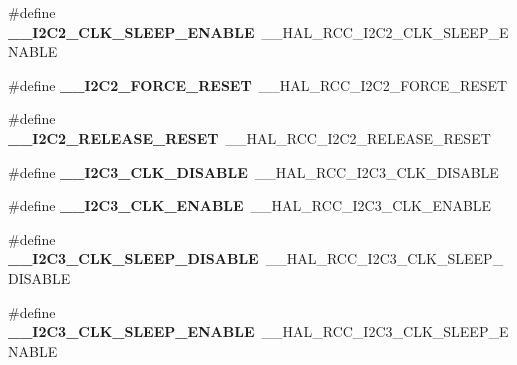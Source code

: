 \begin{DoxyCompactItemize}
\item 
\mbox{\label{group___h_a_l___r_c_c___aliased_ga64ad1beac30d497e381d374778b1a953}} 
\#define {\bfseries \+\_\+\+\_\+\+I2\+C2\+\_\+\+C\+L\+K\+\_\+\+S\+L\+E\+E\+P\+\_\+\+E\+N\+A\+B\+LE}~\+\_\+\+\_\+\+H\+A\+L\+\_\+\+R\+C\+C\+\_\+\+I2\+C2\+\_\+\+C\+L\+K\+\_\+\+S\+L\+E\+E\+P\+\_\+\+E\+N\+A\+B\+LE
\item 
\mbox{\label{group___h_a_l___r_c_c___aliased_ga07143f105327507321078f673940461d}} 
\#define {\bfseries \+\_\+\+\_\+\+I2\+C2\+\_\+\+F\+O\+R\+C\+E\+\_\+\+R\+E\+S\+ET}~\+\_\+\+\_\+\+H\+A\+L\+\_\+\+R\+C\+C\+\_\+\+I2\+C2\+\_\+\+F\+O\+R\+C\+E\+\_\+\+R\+E\+S\+ET
\item 
\mbox{\label{group___h_a_l___r_c_c___aliased_gaf7a482f23ba23252ef88c00e86edde9a}} 
\#define {\bfseries \+\_\+\+\_\+\+I2\+C2\+\_\+\+R\+E\+L\+E\+A\+S\+E\+\_\+\+R\+E\+S\+ET}~\+\_\+\+\_\+\+H\+A\+L\+\_\+\+R\+C\+C\+\_\+\+I2\+C2\+\_\+\+R\+E\+L\+E\+A\+S\+E\+\_\+\+R\+E\+S\+ET
\item 
\mbox{\label{group___h_a_l___r_c_c___aliased_ga7da00da30c1b02d1c1299dd878214db2}} 
\#define {\bfseries \+\_\+\+\_\+\+I2\+C3\+\_\+\+C\+L\+K\+\_\+\+D\+I\+S\+A\+B\+LE}~\+\_\+\+\_\+\+H\+A\+L\+\_\+\+R\+C\+C\+\_\+\+I2\+C3\+\_\+\+C\+L\+K\+\_\+\+D\+I\+S\+A\+B\+LE
\item 
\mbox{\label{group___h_a_l___r_c_c___aliased_gaf7f71023839a5cad83bada95ff73741f}} 
\#define {\bfseries \+\_\+\+\_\+\+I2\+C3\+\_\+\+C\+L\+K\+\_\+\+E\+N\+A\+B\+LE}~\+\_\+\+\_\+\+H\+A\+L\+\_\+\+R\+C\+C\+\_\+\+I2\+C3\+\_\+\+C\+L\+K\+\_\+\+E\+N\+A\+B\+LE
\item 
\mbox{\label{group___h_a_l___r_c_c___aliased_ga35accdf6700c08b879d2540130cf19aa}} 
\#define {\bfseries \+\_\+\+\_\+\+I2\+C3\+\_\+\+C\+L\+K\+\_\+\+S\+L\+E\+E\+P\+\_\+\+D\+I\+S\+A\+B\+LE}~\+\_\+\+\_\+\+H\+A\+L\+\_\+\+R\+C\+C\+\_\+\+I2\+C3\+\_\+\+C\+L\+K\+\_\+\+S\+L\+E\+E\+P\+\_\+\+D\+I\+S\+A\+B\+LE
\item 
\mbox{\label{group___h_a_l___r_c_c___aliased_gabd22a89f4561c5988d6553525c4f2ace}} 
\#define {\bfseries \+\_\+\+\_\+\+I2\+C3\+\_\+\+C\+L\+K\+\_\+\+S\+L\+E\+E\+P\+\_\+\+E\+N\+A\+B\+LE}~\+\_\+\+\_\+\+H\+A\+L\+\_\+\+R\+C\+C\+\_\+\+I2\+C3\+\_\+\+C\+L\+K\+\_\+\+S\+L\+E\+E\+P\+\_\+\+E\+N\+A\+B\+LE

\end{DoxyCompactItemize}
